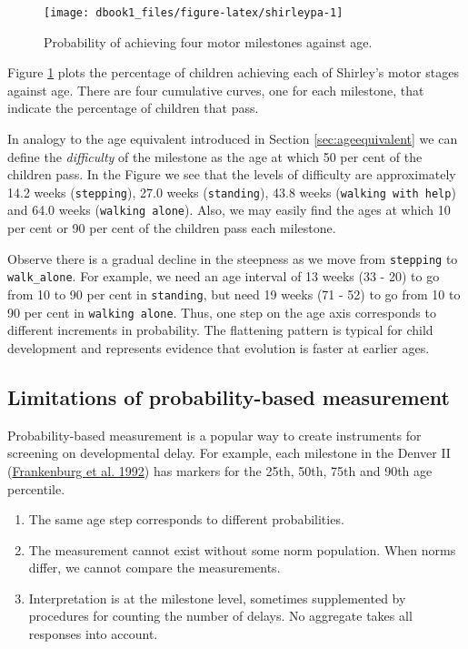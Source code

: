 \documentclass[
]{book}
\begin{document}
\begin{figure}

{\centering \texttt{[image: dbook1\_files/figure-latex/shirleypa-1]} 

}

\caption{Probability of achieving four motor milestones against age.}\label{fig:shirleypa}
\end{figure}



Figure \ref{fig:shirleypa} plots the percentage of children achieving each of Shirley's motor stages against age. There are four cumulative curves, one for each milestone, that indicate the percentage of children that pass.

In analogy to the age equivalent introduced in Section \ref{sec:ageequivalent} we can define the \emph{difficulty} of the milestone as the age at which 50 per cent of the children pass. In the Figure we see that the levels of difficulty are approximately 14.2 weeks (\texttt{stepping}), 27.0 weeks (\texttt{standing}), 43.8 weeks (\texttt{walking\ with\ help}) and 64.0 weeks (\texttt{walking\ alone}). Also, we may easily find the ages at which 10 per cent or 90 per cent of the children pass each milestone.

Observe there is a gradual decline in the steepness as we move from \texttt{stepping} to \texttt{walk\_alone}. For example, we need an age interval of 13 weeks (33 - 20) to go from 10 to 90 per cent in \texttt{standing}, but need 19 weeks (71 - 52) to go from 10 to 90 per cent in \texttt{walking\ alone}. Thus, one step on the age axis corresponds to different increments in probability. The flattening pattern is typical for child development and represents evidence that evolution is faster at earlier ages.

\hypertarget{limitations-of-probability-based-measurement}{%
\subsection{Limitations of probability-based measurement}\label{limitations-of-probability-based-measurement}}

Probability-based measurement is a popular way to create instruments for screening on developmental delay. For example, each milestone in the Denver II (\protect\hyperlink{ref-frankenburg1992}{Frankenburg et al. 1992}) has markers for the 25th, 50th, 75th and 90th age percentile.

\begin{enumerate}
\def\labelenumi{\arabic{enumi}.}
\item
  The same age step corresponds to different probabilities.
\item
  The measurement cannot exist without some norm population. When norms differ, we cannot compare the measurements.
\item
  Interpretation is at the milestone level, sometimes supplemented by procedures for counting the number of delays. No aggregate takes all responses into account.
\end{enumerate}
\end{document}
